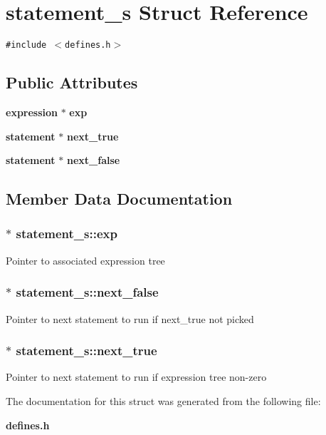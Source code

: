 \section{statement\_\-s  Struct Reference}
\label{structstatement__s}
{\tt \#include $<$defines.h$>$}

\subsection*{Public Attributes}
\begin{CompactItemize}
\item 
{\bf expression} $\ast$ {\bf exp}
\item 
{\bf statement} $\ast$ {\bf next\_\-true}
\item 
{\bf statement} $\ast$ {\bf next\_\-false}
\end{CompactItemize}


\subsection{Member Data Documentation}
\subsubsection{$\ast$ statement\_\-s::exp}\label{structstatement__s_m0}


Pointer to associated expression tree 
\subsubsection{$\ast$ statement\_\-s::next\_\-false}\label{structstatement__s_m2}


Pointer to next statement to run if next\_\-true not picked 
\subsubsection{$\ast$ statement\_\-s::next\_\-true}\label{structstatement__s_m1}


Pointer to next statement to run if expression tree non-zero 

The documentation for this struct was generated from the following file:\begin{CompactItemize}
\item 
{\bf defines.h}\end{CompactItemize}
